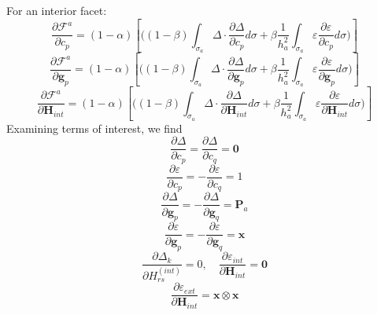 \documentclass[11pt]{article} %
\begin{document}
For an interior facet:
\begin{equation}
	\frac{\partial \mathcal{F}^a}{\partial c_p} = (1-\alpha) \left[ \bigg( (1-\beta) \int_{\sigma_a} \Delta \cdot \frac{\partial \Delta}{\partial c_p} d \sigma + \beta \frac{1}{h_a^2} \int_{\sigma_a} \varepsilon \frac{\partial \varepsilon}{\partial c_p} d \sigma \bigg) \right]
\end{equation}
\begin{equation}
	\frac{\partial \mathcal{F}^a}{\partial \mathbf{g}_p} = (1-\alpha) \left[ \bigg( (1-\beta) \int_{\sigma_a} \Delta \cdot \frac{\partial \Delta}{\partial \mathbf{g}_p} d \sigma + \beta \frac{1}{h_a^2} \int_{\sigma_a} \varepsilon \frac{\partial \varepsilon}{\partial \mathbf{g}_p} d \sigma \bigg) \right]
\end{equation}
\begin{equation}
	\frac{\partial \mathcal{F}^a}{\partial \mathbf{H}_{int}} = (1-\alpha) \left[ \bigg( (1-\beta) \int_{\sigma_a} \Delta \cdot \frac{\partial \Delta}{\partial \mathbf{H}_{int}} d \sigma + \beta \frac{1}{h_a^2} \int_{\sigma_a} \varepsilon \frac{\partial \varepsilon}{\partial \mathbf{H}_{int}} d \sigma \bigg) \right]
\end{equation}
Examining terms of interest, we find
\begin{equation}
	\frac{\partial \Delta}{\partial c_p} = \frac{\partial \Delta}{\partial c_q} = \mathbf{0}
\end{equation}
\begin{equation}
	\frac{\partial \varepsilon}{\partial c_p} = - \frac{\partial \varepsilon}{\partial c_q} = 1
\end{equation}
\begin{equation}
	\frac{\partial \Delta}{\partial \mathbf{g}_p} = - \frac{\partial \Delta}{\partial \mathbf{g}_q} = \mathbf{P}_a
\end{equation}
\begin{equation}
	\frac{\partial \varepsilon}{\partial \mathbf{g}_p} = - \frac{\partial \varepsilon}{\partial \mathbf{g}_q} = \mathbf{x}
\end{equation}
\begin{equation}
	\frac{\partial \Delta_k}{\partial H_{rs}^{(int)}} = 0, \quad \frac{\partial \varepsilon_{int}}{\partial \mathbf{H}_{int}} = \mathbf{0}
\end{equation}
\begin{equation}
	\frac{\partial \varepsilon_{ext}}{\partial \mathbf{H}_{int}} = \mathbf{x} \otimes \mathbf{x}
\end{equation}
\end{document}
